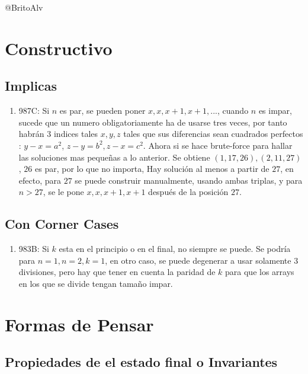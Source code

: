 \documentclass[14pt]{extarticle}
\begin{document}
@BritoAlv

\section{Constructivo}


\subsection{Implicas}

\begin{enumerate}
    \item 987C: Si $n$ es par, se pueden poner $x,x, x+1, x+1, ...$, cuando $n$ es impar, sucede que un numero obligatoriamente ha de usarse tres veces, por tanto habrán $3$ indices tales $x, y, z$ tales que sus diferencias sean cuadrados perfectos : $y - x = a^2$, $z - y = b^2, z - x = c^2$. Ahora si se hace brute-force para hallar las soluciones mas pequeñas a lo anterior. Se obtiene $(1, 17, 26), (2, 11, 27)$, $26$ es par, por lo que no importa, Hay solución al menos a partir de $27$, en efecto, para $27$ se puede construir manualmente, usando ambas triplas, y para $n > 27$, se le pone $x, x, x+1, x+1$ después de la posición $27$.
\end{enumerate}

\subsection{Con Corner Cases}

\begin{enumerate}
    \item 983B: Si $k$ esta en el principio o en el final, no siempre se puede. Se podría para $n = 1, n = 2, k = 1$, en otro caso, se puede degenerar a usar solamente $3$ divisiones, pero hay que tener en cuenta la paridad de $k$ para que los arrays en los que se divide tengan tamaño impar.
\end{enumerate}

\section{Formas de Pensar}

\subsection{Propiedades de el estado final o Invariantes}
\end{document}
